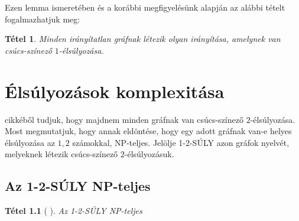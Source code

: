 \documentclass[12pt, a4paper]{report}
\newtheorem{tét}{Tétel}[section]
\theoremstyle{remark}
\theoremstyle{definition}
\begin{document}
Ezen lemma ismeretében és a korábbi megfigyelésünk alapján az alábbi tételt fogalmazhatjuk meg:

\begin{tét}
Minden irányítatlan gráfnak létezik olyan irányítása, amelynek van csúcs-színező $1$-élsúlyozása.
\end{tét}

\chapter{Élsúlyozások komplexitása}
\citeauthor{AddarioBerry2008} \cite{AddarioBerry2008} cikkéből tudjuk, hogy majdnem minden gráfnak van csúcs-színező $2$-élsúlyozása. Most megmutatjuk, hogy annak eldöntése, hogy egy adott gráfnak van-e helyes élsúlyozása az $1, 2$ számokkal, NP-teljes. Jelölje 1-2-SÚLY azon gráfok nyelvét, melyeknek létezik csúcs-színező $2$-élsúlyozásuk.

\section{Az 1-2-SÚLY NP-teljes}
\begin{tét}[\citeauthor{Dudek2011} \cite{Dudek2011}]
Az 1-2-SÚLY NP-teljes
\end{tét}
\end{document}
